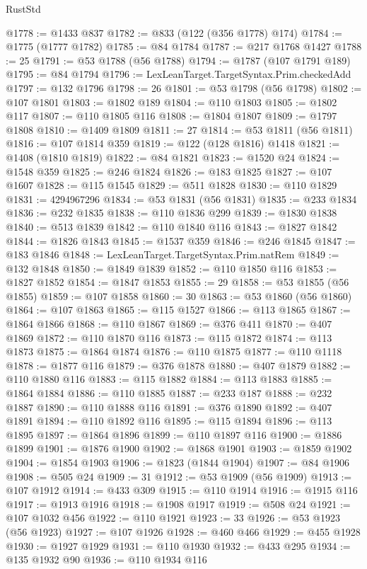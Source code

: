 \begin{lexlean}{RustStd}
\begin{coremodule}
{\begin{coremodule}
{{{{{{{{{{{{{{{{{{{{{{{{{{{{{{{{{{{{{{{{{{{{{{{@1778 := @1433 @837
@1782 := @833 (@122 (@356 @1778) @174)
@1784 := @1775 (@1777 @1782)
@1785 := @84 @1784
@1787 := @217 @1768 @1427
@1788 := 25
@1791 := @53 @1788 (@56 @1788)
@1794 := @1787 (@107 @1791 @189)
@1795 := @84 @1794
@1796 := LexLeanTarget.TargetSyntax.Prim.checkedAdd
@1797 := @132 @1796
@1798 := 26
@1801 := @53 @1798 (@56 @1798)
@1802 := @107 @1801
@1803 := @1802 @189
@1804 := @110 @1803
@1805 := @1802 @117
@1807 := @110 @1805 @116
@1808 := @1804 @1807
@1809 := @1797 @1808
@1810 := @1409 @1809
@1811 := 27
@1814 := @53 @1811 (@56 @1811)
@1816 := @107 @1814 @359
@1819 := @122 (@128 @1816) @1418
@1821 := @1408 (@1810 @1819)
@1822 := @84 @1821
@1823 := @1520 @24
@1824 := @1548 @359
@1825 := @246 @1824
@1826 := @183 @1825
@1827 := @107 @1607
@1828 := @115 @1545
@1829 := @511 @1828
@1830 := @110 @1829
@1831 := 4294967296
@1834 := @53 @1831 (@56 @1831)
@1835 := @233 @1834
@1836 := @232 @1835
@1838 := @110 @1836 @299
@1839 := @1830 @1838
@1840 := @513 @1839
@1842 := @110 @1840 @116
@1843 := @1827 @1842
@1844 := @1826 @1843
@1845 := @1537 @359
@1846 := @246 @1845
@1847 := @183 @1846
@1848 := LexLeanTarget.TargetSyntax.Prim.natRem
@1849 := @132 @1848
@1850 := @1849 @1839
@1852 := @110 @1850 @116
@1853 := @1827 @1852
@1854 := @1847 @1853
@1855 := 29
@1858 := @53 @1855 (@56 @1855)
@1859 := @107 @1858
@1860 := 30
@1863 := @53 @1860 (@56 @1860)
@1864 := @107 @1863
@1865 := @115 @1527
@1866 := @113 @1865
@1867 := @1864 @1866
@1868 := @110 @1867
@1869 := @376 @411
@1870 := @407 @1869
@1872 := @110 @1870 @116
@1873 := @115 @1872
@1874 := @113 @1873
@1875 := @1864 @1874
@1876 := @110 @1875
@1877 := @110 @1118
@1878 := @1877 @116
@1879 := @376 @1878
@1880 := @407 @1879
@1882 := @110 @1880 @116
@1883 := @115 @1882
@1884 := @113 @1883
@1885 := @1864 @1884
@1886 := @110 @1885
@1887 := @233 @187
@1888 := @232 @1887
@1890 := @110 @1888 @116
@1891 := @376 @1890
@1892 := @407 @1891
@1894 := @110 @1892 @116
@1895 := @115 @1894
@1896 := @113 @1895
@1897 := @1864 @1896
@1899 := @110 @1897 @116
@1900 := @1886 @1899
@1901 := @1876 @1900
@1902 := @1868 @1901
@1903 := @1859 @1902
@1904 := @1854 @1903
@1906 := @1823 (@1844 @1904)
@1907 := @84 @1906
@1908 := @505 @24
@1909 := 31
@1912 := @53 @1909 (@56 @1909)
@1913 := @107 @1912
@1914 := @433 @309
@1915 := @110 @1914
@1916 := @1915 @116
@1917 := @1913 @1916
@1918 := @1908 @1917
@1919 := @508 @24
@1921 := @107 @1032 @456
@1922 := @110 @1921
@1923 := 33
@1926 := @53 @1923 (@56 @1923)
@1927 := @107 @1926
@1928 := @460 @466
@1929 := @455 @1928
@1930 := @1927 @1929
@1931 := @110 @1930
@1932 := @433 @295
@1934 := @135 @1932 @90
@1936 := @110 @1934 @116
}}}}}}}}}}}}}}}}}}}}}}}}}}}}}}}}}}}}}}}}}}}}}}}
\end{coremodule}}
\end{coremodule}
\end{lexlean}
